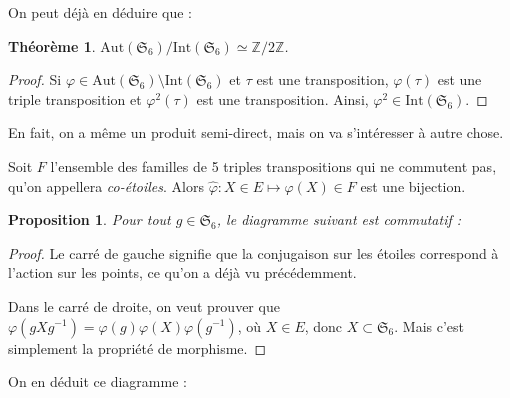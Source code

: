 \documentclass[a4paper, 11pt]{article}
\def\Z{\mathbb{Z}}
\def\Sigmap{\mathfrak{S}}
\def\Aut{\mathrm{Aut}}
\newtheorem*{proposition}{Proposition}
\newtheorem*{theorem}{Théorème}
\begin{document}
On peut déjà en déduire que :

\begin{theorem}
  $\Aut(\Sigmap_6)/\mathrm{Int}(\Sigmap_6) \simeq \Z/2\Z$.
\end{theorem}
\begin{proof}
  Si $\varphi \in \Aut(\Sigmap_6) \setminus \mathrm{Int}(\Sigmap_6)$ et
  $\tau$ est une transposition, $\varphi(\tau)$ est une triple transposition et
  $\varphi^2(\tau)$ est une transposition. Ainsi, $\varphi^2 \in
  \mathrm{Int}(\Sigmap_6)$.
\end{proof}

En fait, on a même un produit semi-direct, mais on va s'intéresser à autre
chose.

Soit $F$ l'ensemble des familles de 5 triples transpositions qui ne commutent
pas, qu'on appellera \emph{co-étoiles}. Alors $\widehat{\varphi} : X \in E \mapsto
\varphi(X) \in F$ est une bijection.

\begin{proposition}
  Pour tout $g \in \Sigmap_6$, le diagramme suivant est commutatif :
  \begin{center}
  \end{center}
\end{proposition}
\begin{proof}
  Le carré de gauche signifie que la conjugaison sur les étoiles correspond à
  l'action sur les points, ce qu'on a déjà vu précédemment.
  
  Dans le carré de droite, on veut prouver que $\varphi(gXg^{-1}) =
  \varphi(g)\varphi(X)\varphi(g^{-1})$, où $X \in E$, donc $X \subset \Sigmap_6$. Mais
  c'est simplement la propriété de morphisme.
\end{proof}
On en déduit ce diagramme :
\end{document}
